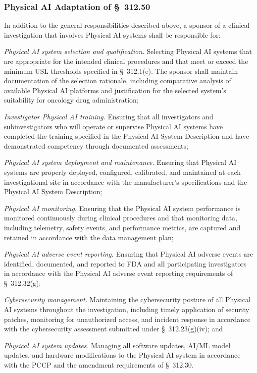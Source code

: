 \documentclass[11pt]{article}
\begin{document}
\subsubsection{Physical AI Adaptation of \S~312.50}

In addition to the general responsibilities described above, a sponsor of a clinical investigation that involves Physical AI systems shall be responsible for:

\begin{description}[leftmargin=0.8cm,style=sameline]
\item[(a)] \textit{Physical AI system selection and qualification.} Selecting Physical AI systems that are appropriate for the intended clinical procedures and that meet or exceed the minimum USL thresholds specified in \S~312.1(e). The sponsor shall maintain documentation of the selection rationale, including comparative analysis of available Physical AI platforms and justification for the selected system's suitability for oncology drug administration;
\item[(b)] \textit{Investigator Physical AI training.} Ensuring that all investigators and subinvestigators who will operate or supervise Physical AI systems have completed the training specified in the Physical AI System Description and have demonstrated competency through documented assessments;
\item[(c)] \textit{Physical AI system deployment and maintenance.} Ensuring that Physical AI systems are properly deployed, configured, calibrated, and maintained at each investigational site in accordance with the manufacturer's specifications and the Physical AI System Description;
\item[(d)] \textit{Physical AI monitoring.} Ensuring that the Physical AI system performance is monitored continuously during clinical procedures and that monitoring data, including telemetry, safety events, and performance metrics, are captured and retained in accordance with the data management plan;
\item[(e)] \textit{Physical AI adverse event reporting.} Ensuring that Physical AI adverse events are identified, documented, and reported to FDA and all participating investigators in accordance with the Physical AI adverse event reporting requirements of \S~312.32(g);
\item[(f)] \textit{Cybersecurity management.} Maintaining the cybersecurity posture of all Physical AI systems throughout the investigation, including timely application of security patches, monitoring for unauthorized access, and incident response in accordance with the cybersecurity assessment submitted under \S~312.23(g)(iv); and
\item[(g)] \textit{Physical AI system updates.} Managing all software updates, AI/ML model updates, and hardware modifications to the Physical AI system in accordance with the PCCP and the amendment requirements of \S~312.30.
\end{description}
\end{document}
